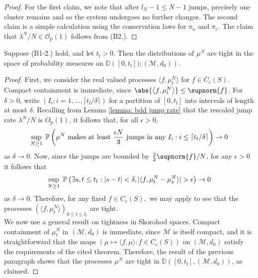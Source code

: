 \begin{proof}
For the first claim, we note that after $l_N-1 \le N-1$ jumps, precisely one cluster remains and so the system undergoes no further changes.  The second claim is a simple calculation using the conservation laws for $\pi_n$ and $\pi_e$. The claim that $\lambda^N/N \in \mathcal{O}_\mathrm{p}(1)$ follows from (B2.).
\end{proof}

\begin{lemma}\label{lemma: tight processes}
Suppose (B1-2.) hold, and let $t_\mathrm{f}>0$. Then
 the distributions of $\mu^N$ are tight in the space of probability measures on $\mathbb{D}\left([0,t_\mathrm{f}]);  \left(\mathcal{M}, d_0\right)\right)$.
\end{lemma}
\begin{proof}
First, we consider the real valued processes $\langle f, \mu^N_t\rangle$ for $f\in C_c(S).$ Compact containment is immediate, since $\abs{\left<f,\mu_t^N\right>} \leq \supnorm{f}$. For $\delta>0$, write $(I_i: i=1,...,\lceil t_\mathrm{f}/\delta\rceil)$ for a partition of $[0,t_\mathrm{f}]$ into intervals of length at most $\delta$. Recalling from Lemma \ref{lemma: bdd jump rate} that the rescaled jump rate $\lambda^N/N$ is $O_\mathrm{p}(1)$, it follows that, for all $\epsilon>0$, \begin{equation} \sup_{N\ge 1}\hspace{0.1cm} \mathbb{P}\left(\mu^N \text{ makes at least }\frac{\epsilon N}{3} \text{ jumps in any  } I_i: i\le \lceil t_\mathrm{f}/\delta\rceil\right) \rightarrow 0 \end{equation} as $\delta\rightarrow 0.$ Now, since the jumps are bounded by $\frac{3}{2}\supnorm{f}/N$, for any $\epsilon>0$ it follows that \begin{equation} \sup_{N\ge 1} \hspace{0.1cm} \mathbb{P}\left(\exists s, t \le t_\mathrm{f}: |s-t|<\delta, |\langle f, \mu^N_t-\mu^N_s\rangle|>\epsilon\right) \rightarrow 0 \end{equation} as $\delta \rightarrow 0.$ Therefore, for any fixed $f \in C_c(S),$ we may apply \cite[Chapter 3, Theorem 8.6c)]{EK86} to see that the processes $(\langle f, \mu^N_t\rangle)_{0\le t\le t_\mathrm{f}}$ are tight. \medskip \\ 
We now use a general result \cite[Theorem 4.6]{J86} on tightness in Skorohod spaces. Compact containment of $\mu^N_t$ in $(\mathcal{M}, d_0)$ is immediate, since $\mathcal{M}$ is itself compact, and it is straightforward that the maps $(\mu \mapsto \langle f, \mu\rangle: f\in C_c(S))$ on $(\mathcal{M},d_0)$ satisfy the requirements of the cited theorem. Therefore, the result of the previous paragraph shows that the processes $\mu^N$ are tight in $\mathbb{D}([0,t_\mathrm{f}],(\mathcal{M},d_0))$, as claimed.
\end{proof}

